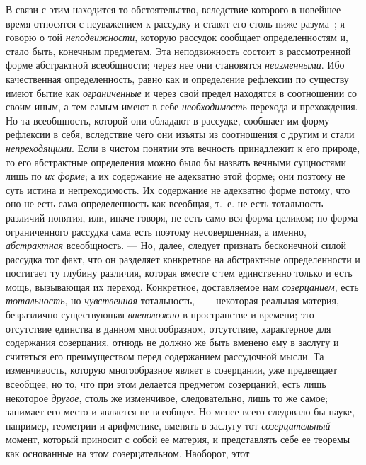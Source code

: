 \documentclass[twoside]{article}
\begin{document}
{{В связи с этим находится то обстоятельство, вследствие
которого в новейшее время относятся с неуважением к рассудку и ставят его
столь ниже
разума~\label{bkm:bm19};
я говорю о той
{\em неподвижности},
которую рассудок сообщает определенностям и, стало быть,
конечным предметам. Эта неподвижность состоит в рассмотренной форме
абстрактной всеобщности; через нее они становятся
{\em неизменными}. Ибо
качественная определенность, равно как и определение рефлексии по существу
имеют бытие как {\em ограниченные}
и через свой предел находятся в соотношении со своим иным,
а тем самым имеют в себе
{\em необходимость}
перехода и прехождения. Но та всеобщность, которой они
обладают в рассудке, сообщает им форму рефлексии в себя, вследствие чего
они изъяты из соотношения с другим и стали
{\em непреходящими}. Если
в чистом понятии эта вечность принадлежит к его природе, то его абстрактные
определения можно было бы назвать вечными сущностями лишь по
{\em их форме}; а их
содержание не адекватно этой форме; они поэтому не суть
истина и непреходимость. Их содержание не адекватно форме потому, что оно
не есть сама определенность как всеобщая, т.~е. не есть тотальность
различий понятия, или, иначе говоря, не есть само вся форма целиком; но
форма ограниченного рассудка сама есть поэтому несовершенная, а именно,
{\em абстрактная}
всеобщность. — Но, далее, следует признать
бесконечной силой рассудка тот факт, что он разделяет конкретное на
абстрактные определенности и постигает ту глубину различия, которая вместе
с тем единственно только и есть мощь, вызывающая их переход. Конкретное,
доставляемое нам {\em созерцанием},
есть {\em тотальность},
но {\em чувственная}
тотальность, — \ некоторая реальная материя,
безразлично существующая
{\em внеположно} в
пространстве и времени; это отсутствие единства в данном многообразном,
отсутствие, характерное для содержания созерцания, отнюдь не должно же быть
вменено ему в заслугу и считаться его преимуществом перед содержанием
рассудочной мысли. Та изменчивость, которую многообразное являет в
созерцании, уже предвещает всеобщее; но то, что при этом делается предметом
созерцаний, есть лишь некоторое
{\em другое}, столь же
изменчивое, следовательно, лишь то же самое; занимает его место и является
не всеобщее. Но менее всего следовало бы науке, например, геометрии и
арифметике, вменять в заслугу тот
{\em созерцательный}
момент, который приносит с собой ее материя, и представлять
себе ее теоремы как основанные на этом созерцательном. Наоборот, этот
}}
\end{document}
